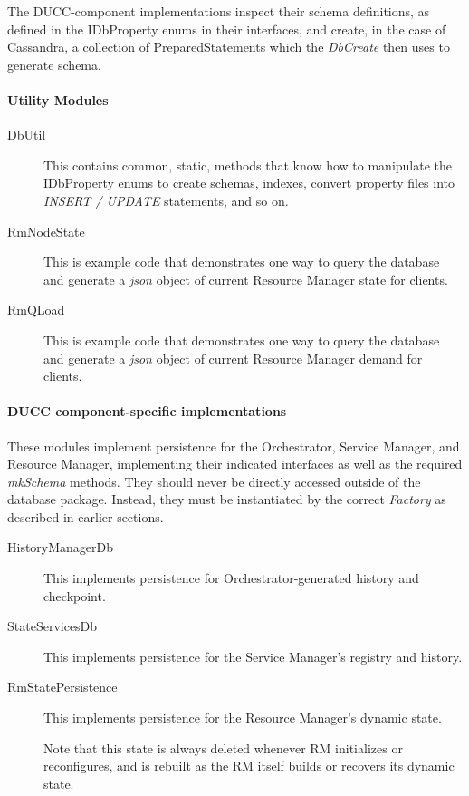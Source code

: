      The DUCC-component implementations inspect their schema definitions, as defined in the
     IDbProperty enums in their interfaces, and create, in the case of Cassandra, a collection
     of PreparedStatements which the {\em DbCreate} then uses to generate schema.

     \paragraph{Utility Modules}
     \begin{description}
       \item[DbUtil] This contains common, static, methods that know how to manipulate
         the IDbProperty enums to create schemas, indexes, convert property files into
         {\em INSERT / UPDATE} statements, and so on.
       \item[RmNodeState] This is example code that demonstrates one way to query the database
         and generate a {\em json} object of current Resource Manager state for clients.
       \item[RmQLoad] This is example code that demonstrates one way to query the database
         and generate a {\em json} object of current Resource Manager demand for clients.
     \end{description}
     
     \paragraph{DUCC component-specific implementations}
     These modules implement persistence for the Orchestrator, Service Manager, and Resource
     Manager, implementing their indicated interfaces as well as the required {\em mkSchema}
     methods.  They should never be directly accessed outside of the database package.  Instead,
     they must be instantiated by the correct {\em Factory} as described in earlier sections.

     \begin{description}
       \item[HistoryManagerDb]This implements persistence for Orchestrator-generated
         history and checkpoint.  
       \item[StateServicesDb] This implements persistence for the Service Manager's
         registry and history.
       \item[RmStatePersistence] This implements persistence for the Resource Manager's
         dynamic state.

         Note that this state is always deleted whenever RM initializes or reconfigures,
         and is rebuilt as the RM itself builds or recovers its dynamic state.
       \end{description}

